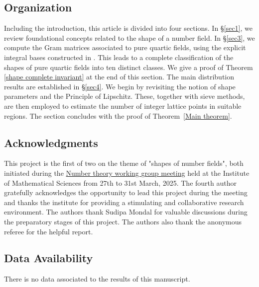 \documentclass[table]{amsart}
\numberwithin{equation}{section}
\begin{document}
\subsection{Organization}
Including the introduction, this article is divided into four sections. In \S\ref{sec1}, we review foundational concepts related to the shape of a number field. In \S\ref{sec3}, we compute the Gram matrices associated to pure quartic fields, using the explicit integral bases constructed in \cite{Funakura}. This leads to a complete classification of the shapes of pure quartic fields into ten distinct classes. We give a proof of Theorem \ref{shape complete invariant} at the end of this section. The main distribution results are established in \S\ref{sec4}. We begin by revisiting the notion of shape parameters and the Principle of Lipschitz. These, together with sieve methods, are then employed to estimate the number of integer lattice points in suitable regions. The section concludes with the proof of Theorem~\ref{Main theorem}.

\medskip
\subsection*{Acknowledgments} This project is the first of two on the theme of "shapes of number fields", both initiated during the \href{https://sites.google.com/view/imscnumbertheorygroupmeeting/home}{Number theory working group meeting} held at the Institute of Mathematical Sciences from 27th to 31st March, 2025. The fourth author gratefully acknowledges the opportunity to lead this project during the meeting and thanks the institute for providing a stimulating and collaborative research environment. The authors thank Sudipa Mondal for valuable discussions during the preparatory stages of this project. The authors also thank the anonymous referee for the helpful report.

\subsection*{Data Availability} There is no data associated to the results of this manuscript.
\end{document}
